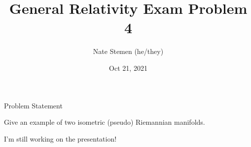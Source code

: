 \documentclass[aspectratio=1610,xcolor=dvipsnames,mathserif]{beamer}
\title{General Relativity Exam Problem 4}
\date{Oct 21, 2021}
\author{Nate Stemen (he/they)}
\institute{AMATH 875}
\newcommand{\problemstatement}{Give an example of two isometric (pseudo) Riemannian manifolds.}
\begin{document}
\maketitle

\begin{frame}{Problem Statement}
	\large
	\begin{prob}
		\problemstatement
	\end{prob}
\end{frame}


\begin{frame}
	\Huge
	I'm still working on the presentation!
\end{frame}
\end{document}
